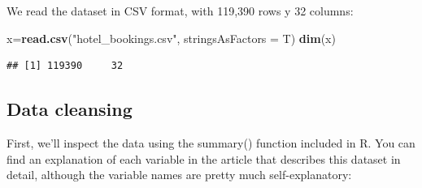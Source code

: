 \documentclass[
]{article}
\newenvironment{Shaded}{\begin{snugshade}}{\end{snugshade}}
\newcommand{\AttributeTok}[1]{\textcolor[rgb]{0.13,0.29,0.53}{#1}}
\newcommand{\FunctionTok}[1]{\textcolor[rgb]{0.13,0.29,0.53}{\textbf{#1}}}
\newcommand{\NormalTok}[1]{#1}
\newcommand{\OtherTok}[1]{\textcolor[rgb]{0.56,0.35,0.01}{#1}}
\newcommand{\StringTok}[1]{\textcolor[rgb]{0.31,0.60,0.02}{#1}}
\begin{document}
We read the dataset in CSV format, with 119,390 rows y 32 columns:

\begin{Shaded}
\begin{Highlighting}[]
\NormalTok{x}\OtherTok{=}\FunctionTok{read.csv}\NormalTok{(}\StringTok{"hotel\_bookings.csv"}\NormalTok{, }\AttributeTok{stringsAsFactors =}\NormalTok{ T)}
\FunctionTok{dim}\NormalTok{(x)}
\end{Highlighting}
\end{Shaded}

\begin{verbatim}
## [1] 119390     32
\end{verbatim}

\subsection{Data cleansing}\label{data-cleansing}

First, we'll inspect the data using the summary() function included in
R. You can find an explanation of each variable in the article that
describes this dataset in detail, although the variable names are pretty
much self-explanatory:
\end{document}
